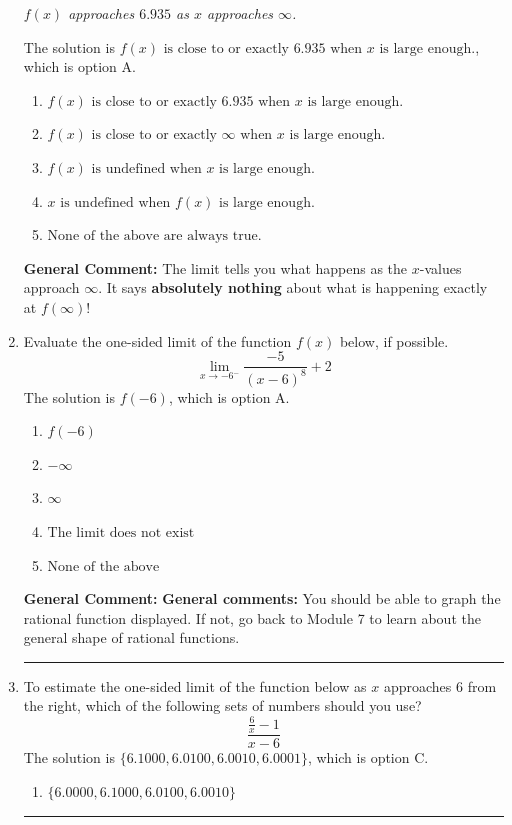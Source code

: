 \documentclass{extbook}[14pt]
\newcommand{\litem}[1]{\item #1

\rule{\textwidth}{0.4pt}}
\begin{document}
\begin{enumerate}
{\begin{center}
    \textit{ $f(x)$ approaches $6.935$ as $x$ approaches $\infty$. }
\end{center}
The solution is \( f(x) \text{ is close to or exactly } 6.935 \text{ when } x \text{ is large enough}. \), which is option A.\begin{enumerate}[label=\Alph*.]
\item \( f(x) \text{ is close to or exactly } 6.935 \text{ when } x \text{ is large enough}. \)


\item \( f(x) \text{ is close to or exactly } \infty \text{ when } x \text{ is large enough}. \)


\item \( f(x) \text{ is undefined when } x \text{ is large enough}. \)


\item \( x \text{ is undefined when } f(x) \text{ is large enough}. \)


\item \( \text{None of the above are always true.} \)


\end{enumerate}

\textbf{General Comment:} The limit tells you what happens as the $x$-values approach $\infty$. It says \textbf{absolutely nothing} about what is happening exactly at $f(\infty)$!
}
\litem{
Evaluate the one-sided limit of the function $f(x)$ below, if possible.
\[ \lim_{x \rightarrow -6^-} \frac{-5}{(x-6)^8}+2 \]The solution is \( f(-6) \), which is option A.\begin{enumerate}[label=\Alph*.]
\item \( f(-6) \)


\item \( -\infty \)


\item \( \infty \)


\item \( \text{The limit does not exist} \)


\item \( \text{None of the above} \)


\end{enumerate}

\textbf{General Comment:} \textbf{General comments:} You should be able to graph the rational function displayed. If not, go back to Module 7 to learn about the general shape of rational functions.
}
\litem{
To estimate the one-sided limit of the function below as $x$ approaches 6 from the right, which of the following sets of numbers should you use?
\[ \frac{\frac{6}{x} - 1}{x - 6} \]The solution is \( \{ 6.1000, 6.0100, 6.0010, 6.0001 \} \), which is option C.\begin{enumerate}[label=\Alph*.]
\item \( \{ 6.0000, 6.1000, 6.0100, 6.0010 \} \)


\end{enumerate}}
\end{enumerate}
\end{document}
